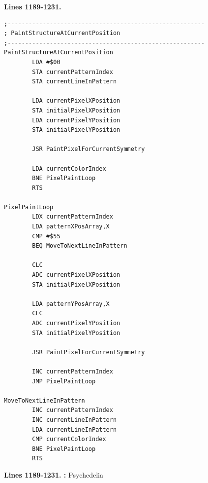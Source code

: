 \clearpage
\textbf{Lines 1189-1231. } 
\begin{lstlisting}[caption = All the pattern data structures in Psychedelia organized into a set of arrays.]
;--------------------------------------------------------
; PaintStructureAtCurrentPosition
;--------------------------------------------------------
PaintStructureAtCurrentPosition   
        LDA #$00
        STA currentPatternIndex
        STA currentLineInPattern

        LDA currentPixelXPosition
        STA initialPixelXPosition
        LDA currentPixelYPosition
        STA initialPixelYPosition

        JSR PaintPixelForCurrentSymmetry

        LDA currentColorIndex
        BNE PixelPaintLoop
        RTS 

PixelPaintLoop   
        LDX currentPatternIndex
        LDA patternXPosArray,X
        CMP #$55
        BEQ MoveToNextLineInPattern

        CLC 
        ADC currentPixelXPosition
        STA initialPixelXPosition

        LDA patternYPosArray,X
        CLC 
        ADC currentPixelYPosition
        STA initialPixelYPosition

        JSR PaintPixelForCurrentSymmetry

        INC currentPatternIndex
        JMP PixelPaintLoop

MoveToNextLineInPattern   
        INC currentPatternIndex
        INC currentLineInPattern
        LDA currentLineInPattern
        CMP currentColorIndex
        BNE PixelPaintLoop
        RTS 
\end{lstlisting}
\clearpage

\textbf{Lines 1189-1231. :} Psychedelia

